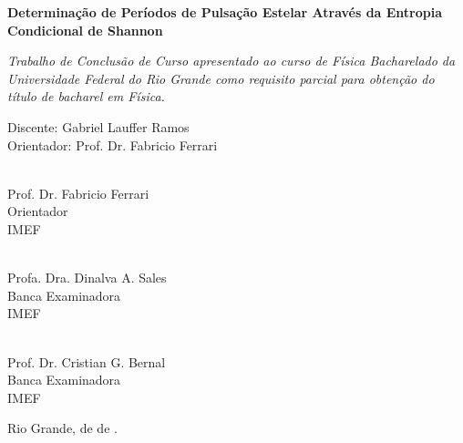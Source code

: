 \documentclass[
12pt, %
english, brazil, %
doublespacing,
nolistspacing, %
liststotoc, %
]{MastersDoctoralThesis} %
\begin{document}
\begin{titlepage}
	\begin{center}
		\textbf{Determinação de Períodos de Pulsação Estelar Através da Entropia Condicional de Shannon}

		\normalsize

		\vfill

		\large

		\textit{Trabalho de Conclusão de Curso apresentado ao curso de Física Bacharelado da Universidade Federal do Rio Grande como requisito parcial para obtenção do título de bacharel em Física.}\\ [0.3cm]

		\normalsize
			\begin{flushright}
				Discente: Gabriel Lauffer Ramos \\
				Orientador: Prof. Dr. Fabricio Ferrari
			\end{flushright}

	\end{center}

	\vfill

	\begin{center}
		\underline{\hspace{7cm}} \\
		Prof. Dr. Fabricio Ferrari \\
		Orientador \\
		IMEF
	\end{center}

	\vfill

	\begin{minipage}{0.45\textwidth}
		\centering
		\underline{\hspace{5.5cm}}  \\
		Profa. Dra. Dinalva A. Sales \\
		Banca Examinadora \\
		IMEF
	\end{minipage}
%
	\begin{minipage}{0.45\textwidth}
		\centering
		\underline{\hspace{5.5cm}}   \\
		Prof. Dr. Cristian G. Bernal \\
		Banca Examinadora \\
		IMEF
	\end{minipage}

	\vfill

	\begin{flushright}
		Rio Grande, \underline{\hspace{1cm}} de  \underline{\hspace{3cm}} de  \underline{\hspace{1.5cm}}.
	\end{flushright}

\end{titlepage}
\end{document}
